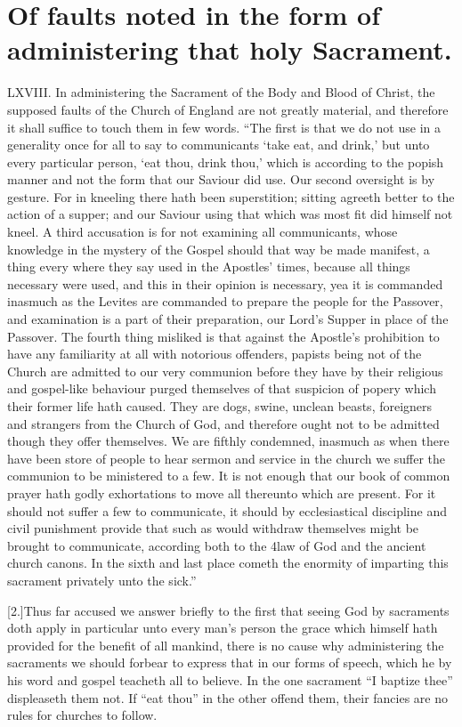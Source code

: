 \section*{Of faults noted in the form of administering that holy Sacrament.}
LXVIII. In administering the Sacrament of the Body and Blood of Christ, the supposed faults of the Church of England are not greatly material, and therefore it shall suffice to touch them in few words. “The first is that we do not use in a generality once for all to say to communicants ‘take eat, and drink,’ but unto every particular person, ‘eat thou, drink thou,’ which is according to the popish manner and not the form that our Saviour did use. Our second oversight is by gesture. For in kneeling there hath been superstition; sitting agreeth better to the action of a supper; and our Saviour using that which was most fit did himself not kneel. A third accusation is for not examining all communicants, whose knowledge in the mystery of the Gospel should that way be made manifest, a thing every where they say used in the Apostles’ times, because all things necessary were used,  and this in their opinion is necessary,
 yea it is commanded inasmuch as the Levites are commanded to prepare the people for the Passover, and examination is a part of their preparation, our Lord’s Supper in place of the Passover. The fourth thing misliked is that against the Apostle’s prohibition to have any familiarity at all with notorious offenders, papists being not of the Church are admitted to our very communion before they have by their religious and gospel-like behaviour purged themselves of that suspicion of popery which their former life hath caused. They are dogs, swine, unclean beasts, foreigners and strangers from the Church of God, and therefore ought not to be admitted though they offer themselves. We are fifthly condemned, inasmuch as when there have been store of people to hear sermon and service in the church we suffer the communion to be ministered to a few. It is not enough that our book of common prayer hath godly exhortations to move all thereunto which are present. For it should not suffer a few to communicate, it should by ecclesiastical discipline and civil punishment provide that such as would withdraw themselves might be brought to communicate, according both to the 4law of God and the ancient church canons. In the sixth and last place cometh the enormity of imparting this sacrament privately unto the sick.”




[2.]Thus far accused we answer briefly to the first that seeing God by sacraments doth apply in particular unto every man’s person the grace which himself hath provided for the benefit of all mankind, there is no cause why administering the sacraments we should forbear to express that in our forms of speech, which he by his word and gospel teacheth all to believe. In the one sacrament “I baptize thee” displeaseth them not. If “eat thou” in the other offend them, their fancies are no rules for churches to follow.

